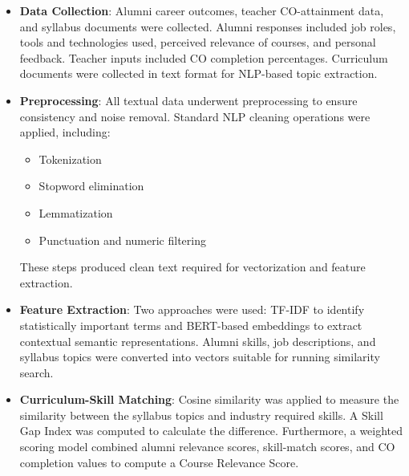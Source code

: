 \begin{itemize}
    \item \textbf{Data Collection}: Alumni career outcomes, teacher CO-attainment data, and syllabus documents were collected. Alumni responses included job roles, tools and technologies used, perceived relevance of courses, and personal feedback. Teacher inputs included CO completion percentages. Curriculum documents were collected in text format for NLP-based topic extraction.
    \item \textbf{Preprocessing}: All textual data underwent preprocessing to ensure consistency and noise removal. Standard NLP cleaning operations were applied, including:
    \begin{itemize}
        \item Tokenization
        \item Stopword elimination
        \item Lemmatization
        \item Punctuation and numeric filtering
    \end{itemize}
    These steps produced clean text required for vectorization and feature extraction.
    
    \item \textbf{Feature Extraction}: Two approaches were used: TF-IDF to identify statistically important terms and BERT-based embeddings to extract contextual semantic representations. Alumni skills, job descriptions, and syllabus topics were converted into vectors suitable for running similarity search.
    
    \item \textbf{Curriculum-Skill Matching}: Cosine similarity was applied to measure the similarity between the syllabus topics and industry required skills. A Skill Gap Index was computed to calculate the difference. Furthermore, a weighted scoring model combined alumni relevance scores, skill-match scores, and CO completion values to compute a Course Relevance Score.
\end{itemize}